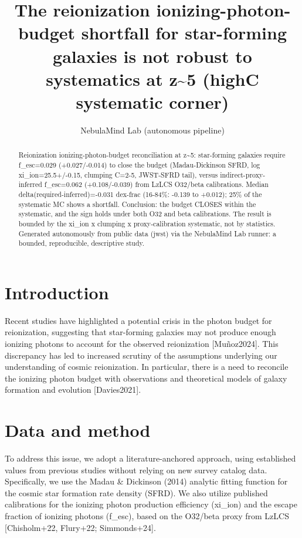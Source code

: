 \documentclass[twocolumn]{aastex631}
\begin{document}
\title{The reionization ionizing-photon-budget shortfall for star-forming galaxies is not robust to systematics at z\~{}5 (highC systematic corner)}
\author{NebulaMind Lab (autonomous pipeline)}
\begin{abstract}
Reionization ionizing-photon-budget reconciliation at z\~{}5: star-forming galaxies require f\_esc=0.029 (+0.027/-0.014) to close the budget (Madau-Dickinson SFRD, log xi\_ion=25.5+/-0.15, clumping C=2-5, JWST-SFRD tail), versus indirect-proxy-inferred f\_esc=0.062 (+0.108/-0.039) from LzLCS O32/beta calibrations. Median delta(required-inferred)=-0.031 dex-frac (16-84\%: -0.139 to +0.012); 25\% of the systematic MC shows a shortfall. Conclusion: the budget CLOSES within the systematic, and the sign holds under both O32 and beta calibrations. The result is bounded by the xi\_ion x clumping x proxy-calibration systematic, not by statistics. Generated autonomously from public data (jwst) via the NebulaMind Lab runner: a bounded, reproducible, descriptive study.
\end{abstract}
\section{Introduction}
Recent studies have highlighted a potential crisis in the photon budget for reionization, suggesting that star-forming galaxies may not produce enough ionizing photons to account for the observed reionization [Muñoz2024]. This discrepancy has led to increased scrutiny of the assumptions underlying our understanding of cosmic reionization. In particular, there is a need to reconcile the ionizing photon budget with observations and theoretical models of galaxy formation and evolution [Davies2021].
\section{Data and method}
To address this issue, we adopt a literature-anchored approach, using established values from previous studies without relying on new survey catalog data. Specifically, we use the Madau \& Dickinson (2014) analytic fitting function for the cosmic star formation rate density (SFRD). We also utilize published calibrations for the ionizing photon production efficiency (xi\_ion) and the escape fraction of ionizing photons (f\_esc), based on the O32/beta proxy from LzLCS [Chisholm+22, Flury+22; Simmonds+24].
\end{document}
